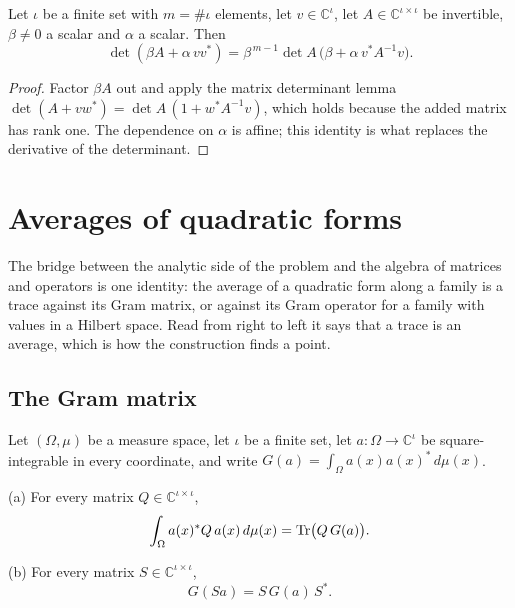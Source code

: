 \begin{lemma}
\label{lem:rank-one-determinant}
\leanok
Let $\iota$ be a finite set with $m = \#\iota$ elements, let $v \in \mathbb{C}^{\iota}$,
let $A \in \mathbb{C}^{\iota \times \iota}$ be invertible, $\beta \neq 0$ a scalar and
$\alpha$ a scalar. Then
\[
  \det(\beta A + \alpha \, v v^*)
    = \beta^{\,m-1} \det A \, \bigl( \beta + \alpha \, v^* A^{-1} v \bigr).
\]
\end{lemma}

\begin{proof}
\leanok
Factor $\beta A$ out and apply the matrix determinant lemma
$\det(A + v w^*) = \det A \, (1 + w^* A^{-1} v)$, which holds because the added matrix
has rank one. The dependence on $\alpha$ is affine; this identity is what replaces the
derivative of the determinant.
\end{proof}

\chapter{Averages of quadratic forms}
\label{ch:averages-of-forms}

The bridge between the analytic side of the problem and the algebra of matrices and
operators is one identity: the average of a quadratic form along a family is a trace
against its Gram matrix, or against its Gram operator for a family with values in a
Hilbert space. Read from right to left it says that a trace is an average, which is how
the construction finds a point.

\section{The Gram matrix}

\begin{lemma}
\label{lem:gram-identities}
\leanok
Let $(\Omega, \mu)$ be a measure space, let $\iota$ be a finite set, let
$a : \Omega \to \mathbb{C}^{\iota}$ be square-integrable in every coordinate, and write
$G(a) = \int_\Omega a(x) a(x)^* \, d\mu(x)$.

(a) For every matrix $Q \in \mathbb{C}^{\iota \times \iota}$,
\[
  \int_\Omega a(x)^* Q \, a(x) \, d\mu(x) = \operatorname{Tr} \bigl( Q \, G(a) \bigr).
\]

(b) For every matrix $S \in \mathbb{C}^{\iota \times \iota}$,
\[
  G(S a) = S \, G(a) \, S^* .
\]
\end{lemma}

